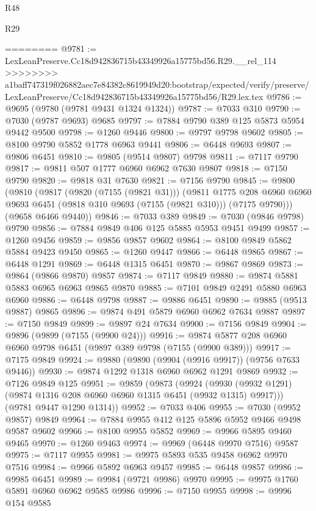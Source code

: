 \begin{lexlean}{R48}
\begin{lexlean}{R29}
\begin{coremodule}
{{{{{{{{{{{{{{{{{{{{{{{{{{{{{{{{{{{{{{{{{{{{{{{{{{{{{{{{{{{{{{{{{{{{{{{{{{{{{{{{{{{{{{{{{{{{{{{{{{{{{{{{{{{{{{{{{{{{{{{{{{{{{{{{{{{{{{{{{{{{{{{{{{{{{{{{{{{{{{{{{{{{{{{{{{{{{{{{{{{{{{{{{{{{{{{{{{{{{{{{{{{{{{{{{{{{{{{{{{========
@9781 := LexLeanPreserve.Cc18d942836715b43349926a15775bd56.R29.__rel_114
>>>>>>>> a1baff747319f026882aec7e84382c8619949d20:bootstrap/expected/verify/preserve/LexLeanPreserve/Cc18d942836715b43349926a15775bd56/R29.lex.tex
@9786 := @9695 (@9780 (@9781 @9431 @1324 @1324))
@9787 := @7033 @310
@9790 := @7030 (@9787 @9693) @9685
@9797 := @7884 @9790 @389 @125 @5873 @5954 @9442 @9500
@9798 := @1260 @9446
@9800 := @9797 @9798 @9602
@9805 := @8100 @9790 @5852 @1778 @6963 @9441
@9806 := @6448 @9693
@9807 := @9806 @6451
@9810 := @9805 (@9514 @9807) @9798
@9811 := @7117 @9790
@9817 := @9811 @507 @1777 @6960 @6962 @7630 @9807
@9818 := @7150 @9790
@9820 := @9818 @31 @7630
@9821 := @7156 @9790
@9845 := @9800
    (@9810
      (@9817
        (@9820 (@7155 (@9821 @31)))
        (@9811
          @1775
          @208
          @6960
          @6960
          @9693
          @6451
          (@9818 @310 @9693 (@7155 (@9821 @310)))
          (@7175 @9790)))
      (@9658 @6466 @9440))
@9846 := @7033 @389
@9849 := @7030 (@9846 @9798) @9790
@9856 := @7884 @9849 @406 @125 @5885 @5953 @9451 @9499
@9857 := @1260 @9456
@9859 := @9856 @9857 @9602
@9864 := @8100 @9849 @5862 @5884 @9423 @9450
@9865 := @1260 @9447
@9866 := @6448 @9865
@9867 := @6448 @1291
@9869 := @6448 @1315 @6451
@9870 := @9867 @9869
@9873 := @9864 (@9866 @9870) @9857
@9874 := @7117 @9849
@9880 := @9874 @5881 @5883 @6965 @6963 @9865 @9870
@9885 := @7101 @9849 @2491 @5880 @6963 @6960
@9886 := @6448 @9798
@9887 := @9886 @6451
@9890 := @9885 (@9513 @9887) @9865
@9896 := @9874 @491 @5879 @6960 @6962 @7634 @9887
@9897 := @7150 @9849
@9899 := @9897 @24 @7634
@9900 := @7156 @9849
@9904 := @9896 (@9899 (@7155 (@9900 @24)))
@9916 := @9874 @5877 @208 @6960 @6960 @9798 @6451 (@9897 @389 @9798 (@7155 (@9900 @389)))
@9917 := @7175 @9849
@9924 := @9880 (@9890 (@9904 (@9916 @9917)) (@9756 @7633 @9446))
@9930 := @9874 @1292 @1318 @6960 @6962 @1291 @9869
@9932 := @7126 @9849 @125
@9951 := @9859
    (@9873
      (@9924 (@9930 (@9932 @1291) (@9874 @1316 @208 @6960 @6960 @1315 @6451 (@9932 @1315) @9917)))
      (@9781 @9447 @1290 @1314))
@9952 := @7033 @406
@9955 := @7030 (@9952 @9857) @9849
@9964 := @7884 @9955 @412 @125 @5896 @5952 @9466 @9498 @9587 @9602
@9966 := @8100 @9955 @5852
@9969 := @9966 @5895 @9460 @9465
@9970 := @1260 @9463
@9974 := @9969 (@6448 @9970 @7516) @9587
@9975 := @7117 @9955
@9981 := @9975 @5893 @535 @9458 @6962 @9970 @7516
@9984 := @9966 @5892 @6963 @9457
@9985 := @6448 @9857
@9986 := @9985 @6451
@9989 := @9984 (@9721 @9986) @9970
@9995 := @9975 @1760 @5891 @6960 @6962 @9585 @9986
@9996 := @7150 @9955
@9998 := @9996 @154 @9585
}}}}}}}}}}}}}}}}}}}}}}}}}}}}}}}}}}}}}}}}}}}}}}}}}}}}}}}}}}}}}}}}}}}}}}}}}}}}}}}}}}}}}}}}}}}}}}}}}}}}}}}}}}}}}}}}}}}}}}}}}}}}}}}}}}}}}}}}}}}}}}}}}}}}}}}}}}}}}}}}}}}}}}}}}}}}}}}}}}}}}}}}}}}}}}}}}}}}}}}}}}}}}}}}}}}}}}}}}}
\end{coremodule}
\end{lexlean}
\end{lexlean}

